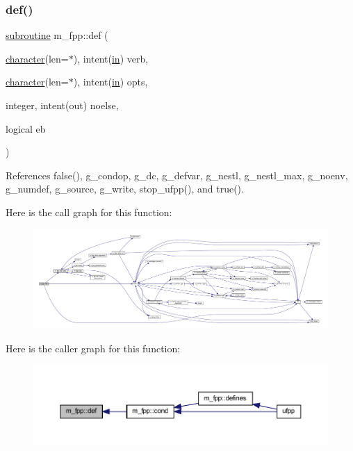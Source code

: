 \subsubsection{\texorpdfstring{def()}{def()}}
{\footnotesize\ttfamily \hyperlink{M__stopwatch_83_8txt_acfbcff50169d691ff02d4a123ed70482}{subroutine} m\+\_\+fpp\+::def (\begin{DoxyParamCaption}\item[{\hyperlink{option__stopwatch_83_8txt_abd4b21fbbd175834027b5224bfe97e66}{character}(len=$\ast$), intent(\hyperlink{M__journal_83_8txt_afce72651d1eed785a2132bee863b2f38}{in})}]{verb,  }\item[{\hyperlink{option__stopwatch_83_8txt_abd4b21fbbd175834027b5224bfe97e66}{character}(len=$\ast$), intent(\hyperlink{M__journal_83_8txt_afce72651d1eed785a2132bee863b2f38}{in})}]{opts,  }\item[{integer, intent(out)}]{noelse,  }\item[{logical}]{eb }\end{DoxyParamCaption})}



References false(), g\+\_\+condop, g\+\_\+dc, g\+\_\+defvar, g\+\_\+nestl, g\+\_\+nestl\+\_\+max, g\+\_\+noenv, g\+\_\+numdef, g\+\_\+source, g\+\_\+write, stop\+\_\+ufpp(), and true().

Here is the call graph for this function\+:
\nopagebreak
\begin{figure}[H]
\begin{center}
\leavevmode
\includegraphics[width=350pt]{namespacem__fpp_af80169d1e05b926eed9d4dbe10963084_cgraph}
\end{center}
\end{figure}
Here is the caller graph for this function\+:
\nopagebreak
\begin{figure}[H]
\begin{center}
\leavevmode
\includegraphics[width=350pt]{namespacem__fpp_af80169d1e05b926eed9d4dbe10963084_icgraph}
\end{center}
\end{figure}
\mbox{\label{namespacem__fpp_a43f195db2d7dcdbaf89cb2e45ca60421}} 
